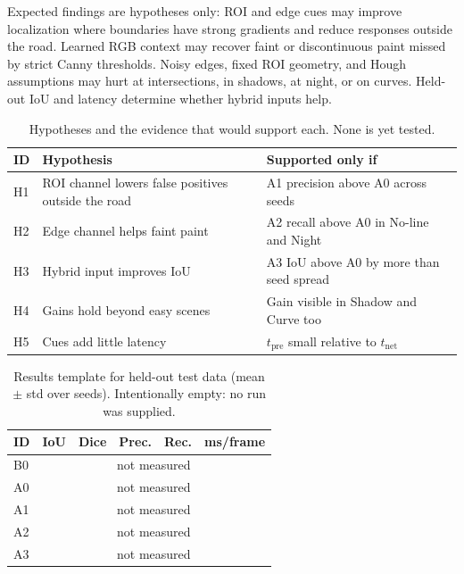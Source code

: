 \documentclass[10pt,a4paper,twocolumn]{article}
\begin{document}
Expected findings are hypotheses only: ROI and edge cues may improve localization where boundaries have strong gradients and reduce responses outside the road. Learned RGB context may recover faint or discontinuous paint missed by strict Canny thresholds. Noisy edges, fixed ROI geometry, and Hough assumptions may hurt at intersections, in shadows, at night, or on curves. Held-out IoU and latency determine whether hybrid inputs help.

\begin{table}[H]
\centering
\caption{Hypotheses and the evidence that would support each. None is yet tested.}
\footnotesize
\begin{tabularx}{\columnwidth}{|l|X|X|}
\hline
\rowcolor{gray!18}\textbf{ID}&\textbf{Hypothesis}&\textbf{Supported only if}\\ \hline
H1 & ROI channel lowers false positives outside the road & A1 precision above A0 across seeds\\ \hline
H2 & Edge channel helps faint paint & A2 recall above A0 in No-line and Night\\ \hline
H3 & Hybrid input improves IoU & A3 IoU above A0 by more than seed spread\\ \hline
H4 & Gains hold beyond easy scenes & Gain visible in Shadow and Curve too\\ \hline
H5 & Cues add little latency & $t_{\mathrm{pre}}$ small relative to $t_{\mathrm{net}}$\\ \hline
\end{tabularx}
\end{table}

\begin{table}[H]
\centering
\caption{Results template for held-out test data (mean $\pm$ std over seeds). Intentionally empty: no run was supplied.}
\footnotesize
\begin{tabular}{|l|c|c|c|c|c|}
\hline
\rowcolor{gray!18}\textbf{ID}&\textbf{IoU}&\textbf{Dice}&\textbf{Prec.}&\textbf{Rec.}&\textbf{ms/frame}\\ \hline
B0 & \multicolumn{5}{c|}{not measured}\\ \hline
A0 & \multicolumn{5}{c|}{not measured}\\ \hline
A1 & \multicolumn{5}{c|}{not measured}\\ \hline
A2 & \multicolumn{5}{c|}{not measured}\\ \hline
A3 & \multicolumn{5}{c|}{not measured}\\ \hline
\end{tabular}
\end{table}
\end{document}
